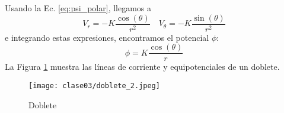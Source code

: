 Usando la Ec. \eqref{eq:psi_polar}, llegamos a
%
\begin{equation}
V_r = -K\frac{\cos(\theta)}{r^2}\quad V_\theta = -K\frac{\sin(\theta)}{r^2}
\end{equation}
%
e integrando estas expresiones, encontramos el potencial $\phi$:
%
\begin{equation}
\phi=K\frac{\cos(\theta)}{r}
\end{equation}
%
La Figura \ref{fig:doblete} muestra las líneas de corriente y equipotenciales de un doblete.
%
\begin{figure}[h!]
\centering
\texttt{[image: clase03/doblete\_2.jpeg]}
\caption{Doblete}
\label{fig:doblete}
\end{figure}
